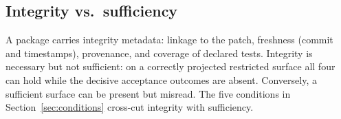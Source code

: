 \subsection{Integrity vs.\ sufficiency}
A package carries integrity metadata: linkage to the patch, freshness (commit
and timestamps), provenance, and coverage of declared tests. Integrity is
necessary but not sufficient: on a correctly projected restricted surface all
four can hold while the decisive acceptance outcomes are absent. Conversely, a
sufficient surface can be present but misread. The five conditions in
Section~\ref{sec:conditions} cross-cut integrity with sufficiency.
